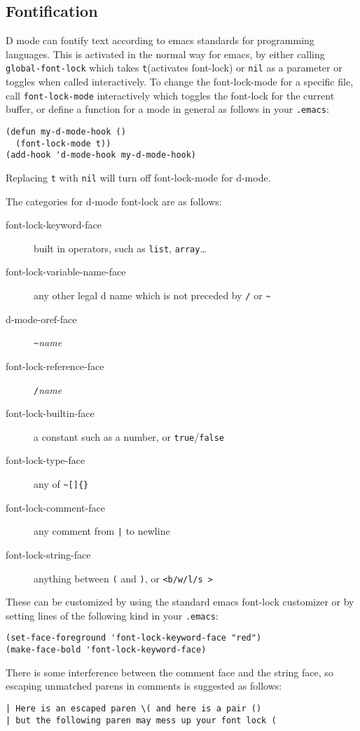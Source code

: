 \documentclass[12pt]{article}
\begin{document}
\subsection{Fontification}
  
D mode can fontify text according to emacs standards for programming
languages. This is activated in the normal way for emacs, by either
calling \verb$global-font-lock$ which takes \verb$t$(activates
font-lock) or \verb$nil$ as a parameter or toggles when called
interactively.  To change the font-lock-mode for a specific file, call
\verb$font-lock-mode$ interactively which toggles the font-lock for
the current buffer, or define a function for a mode in general as
follows in your \texttt{.emacs}:
\begin{verbatim}
(defun my-d-mode-hook ()
  (font-lock-mode t))
(add-hook 'd-mode-hook my-d-mode-hook)
\end{verbatim}
Replacing \verb$t$ with \verb$nil$ will turn off font-lock-mode for
d-mode.

The categories for d-mode font-lock are as follows:
\begin{description}
  \item [font-lock-keyword-face] built in operators, such as
  \verb$list$, \verb$array$\ldots
  \item [font-lock-variable-name-face] any other legal d name which is
  not preceded by \verb$/$ or \verb$~$
  \item [d-mode-oref-face] \verb$~$\emph{name}
  \item [font-lock-reference-face] \verb$/$\emph{name}
  \item [font-lock-builtin-face] a constant such as a number, or
  \verb$true$/\verb$false$
  \item [font-lock-type-face] any of \verb$~[]{}$
  \item [font-lock-comment-face] any comment from \verb$|$ to newline
  \item [font-lock-string-face] anything between \verb$($ and
  \verb$)$, or \verb$<b/w/l/s >$
\end{description}
  
These can be customized by using the standard emacs font-lock
customizer or by setting lines of the following kind in your
\texttt{.emacs}:
\begin{verbatim}
(set-face-foreground 'font-lock-keyword-face "red")
(make-face-bold 'font-lock-keyword-face)
\end{verbatim}
There is some interference between the comment face and the string
face, so escaping unmatched parens in comments is suggested as
follows:
\begin{verbatim}
| Here is an escaped paren \( and here is a pair ()
| but the following paren may mess up your font lock (
\end{verbatim} %
\end{document}
